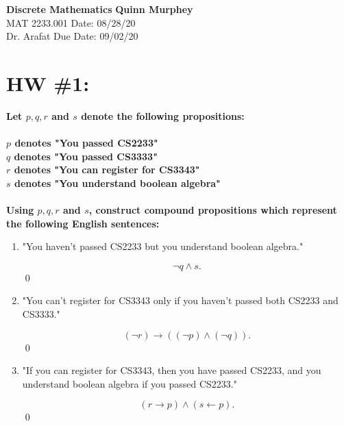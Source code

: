\documentclass[letterpaper, 12pt]{article}
\begin{document}
\noindent
\large\textbf{Discrete Mathematics} \hfill \textbf{Quinn Murphey} \\
\normalsize MAT 2233.001 \hfill Date: 08/28/20 \\
Dr. Arafat \hfill Due Date: 09/02/20 \\
\noindent\makebox[\linewidth]{\rule{\paperwidth}{0.4pt}}
\section*{HW \#1:}
\textbf{Let $p,q,r$ and $s$ denote the following propositions:\\\\
\noindent$p$ denotes "You passed CS2233"\\
\noindent$q$ denotes "You passed CS3333"\\
\noindent$r$ denotes "You can register for CS3343"\\
\noindent$s$ denotes "You understand boolean algebra" \\\\
\noindent Using $p,q,r$ and $s$, construct compound propositions which represent the following English sentences:}
\begin{enumerate}
    \item "You haven't passed CS2233 but you understand boolean algebra."
    
        $$\lnot q \land s.$$\qed
    
    \item "You can't register for CS3343 only if you haven't passed both CS2233 and CS3333."
    
        $$\left(\lnot r \right)\rightarrow \left( \left( \lnot p \right) \land \left( \lnot q \right) \right).$$\qed
        
    \item "If you can register for CS3343, then you have passed CS2233, and you understand boolean algebra if you passed CS2233."
    
        $$\left(r \rightarrow p\right) \land \left( s \leftarrow p \right).$$\qed
\end{enumerate}
\end{document}
